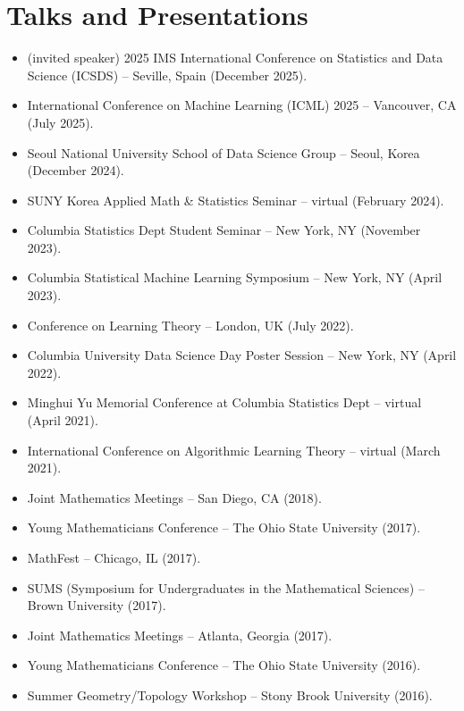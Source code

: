 \documentclass[10pt,a4paper]{moderncv}        %
\begin{document}
\section{Talks and Presentations}
\begin{minipage}{\maincolumnwidth}%
	\small{
    	\begin{itemize}
		\item[\textbullet] (invited speaker) 2025 IMS International Conference on Statistics and Data Science (ICSDS) -- Seville, Spain (December 2025).
		\item[\textbullet]  International Conference on Machine Learning (ICML) 2025 -- Vancouver, CA (July 2025).
		\item[\textbullet] Seoul National University School of Data Science Group -- Seoul, Korea (December 2024).
		\item[\textbullet] SUNY Korea Applied Math \& Statistics Seminar -- virtual (February 2024).
	  \item[\textbullet] Columbia Statistics Dept Student Seminar -- New York, NY (November 2023).
	  \item[\textbullet] Columbia Statistical Machine Learning Symposium -- New York, NY (April 2023).
	  \item[\textbullet] Conference on Learning Theory -- London, UK (July 2022).
	  \item[\textbullet] Columbia University Data Science Day Poster Session -- New York, NY (April 2022).
	\item[\textbullet] Minghui Yu Memorial Conference at Columbia Statistics Dept -- virtual (April 2021).
	\item[\textbullet] International Conference on Algorithmic Learning Theory -- virtual (March 2021).
	\item[\textbullet] Joint Mathematics Meetings -- San Diego, CA (2018).
	\item[\textbullet] Young Mathematicians Conference -- The Ohio State University (2017).
	\item[\textbullet] MathFest -- Chicago, IL (2017).
	\item[\textbullet] SUMS (Symposium for Undergraduates in the Mathematical Sciences) -- Brown University (2017).
	\item[\textbullet] Joint Mathematics Meetings -- Atlanta, Georgia (2017).
	\item[\textbullet] Young Mathematicians Conference -- The Ohio State University (2016).
	\item[\textbullet] Summer Geometry/Topology Workshop -- Stony Brook University (2016).
		\end{itemize}}%
\end{minipage}%
%
\end{document}
